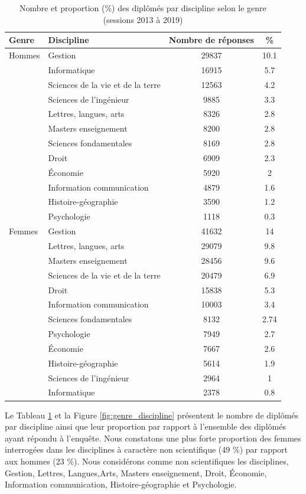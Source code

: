 \documentclass[12pt, a4paper, titlepage, table]{article}
\begin{document}
	\begin{table}[H]
		\centering
		\begin{tabular}{llcc}
			\toprule
			\textbf{Genre} & \textbf{Discipline} & \textbf{Nombre de réponses} & \textbf{\%} \\
			\midrule
			Hommes & Gestion & 29837 & 10.1 \\
			& Informatique & 16915 & 5.7 \\
			& Sciences de la vie et de la terre & 12563 & 4.2 \\
			& Sciences de l'ingénieur & 9885 & 3.3 \\
			& Lettres, langues, arts & 8326 & 2.8 \\
			& Masters enseignement & 8200 & 2.8 \\
			& Sciences fondamentales & 8169 & 2.8 \\
			& Droit & 6909 & 2.3 \\
			& Économie & 5920 & 2 \\
			& Information communication & 4879 & 1.6 \\
			& Histoire-géographie & 3590 & 1.2 \\
			& Psychologie & 1118 & 0.3 \\
			\midrule
			Femmes & Gestion & 41632 & 14 \\
			& Lettres, langues, arts & 29079 & 9.8 \\
			& Masters enseignement & 28456 & 9.6 \\
			& Sciences de la vie et de la terre & 20479 & 6.9 \\
			& Droit & 15838 & 5.3 \\
			& Information communication & 10003 & 3.4 \\
			& Sciences fondamentales & 8132 & 2.74 \\
			& Psychologie & 7949 & 2.7 \\
			& Économie & 7667 & 2.6 \\
			& Histoire-géographie & 5614 & 1.9 \\
			& Sciences de l'ingénieur & 2964 & 1 \\
			& Informatique & 2378 & 0.8 \\
			\bottomrule
		\end{tabular}
		\caption{Nombre et proportion (\%) des diplômés par discipline selon le genre (sessions 2013 à 2019)}
		\label{tab:genre_discipline}
	\end{table}

	
	Le Tableau \ref{tab:genre_discipline} et la Figure \ref{fig:genre_discipline} présentent le nombre de diplômés par discipline ainsi que leur proportion par rapport à l'ensemble des diplômés ayant répondu à l'enquête.
	Nous constatons une plus forte proportion des femmes interrogées dans les disciplines à caractère non scientifique (49 \%) par rapport aux hommes (23 \%).
	Nous considérons comme non scientifiques les  disciplines, Gestion, Lettres, Langues,Arts, Masters enseignement, Droit, Économie, Information communication, Histoire-géographie et Psychologie.
	
\end{document}
